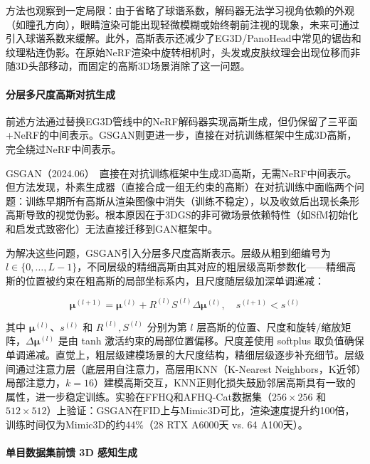 方法也观察到一定局限：由于省略了球谐系数，解码器无法学习视角依赖的外观（如瞳孔方向），眼睛渲染可能出现轻微模糊或始终朝前注视的现象，未来可通过引入球谐系数来缓解。此外，高斯表示还减少了EG3D/PanoHead中常见的锯齿和纹理粘连伪影。在原始NeRF渲染中旋转相机时，头发或皮肤纹理会出现位移而非随3D头部移动，而固定的高斯3D场景消除了这一问题。

\paragraph{分层多尺度高斯对抗生成}

前述方法通过替换EG3D管线中的NeRF解码器实现高斯生成，但仍保留了三平面+NeRF的中间表示。GSGAN则更进一步，直接在对抗训练框架中生成3D高斯，完全绕过NeRF中间表示。

GSGAN（2024.06）~\cite{2406_02968}直接在对抗训练框架中生成3D高斯，无需NeRF中间表示。但方法发现，朴素生成器（直接合成一组无约束的高斯）在对抗训练中面临两个问题：训练早期所有高斯从渲染图像中消失（训练不稳定），以及收敛后出现长条形高斯导致的视觉伪影。根本原因在于3DGS的非可微场景依赖特性（如SfM初始化和启发式致密化）无法直接迁移到GAN框架中。

为解决这些问题，GSGAN引入分层多尺度高斯表示。层级从粗到细编号为 $l \in \{0, \ldots, L-1\}$，不同层级的精细高斯由其对应的粗层级高斯参数化——精细高斯的位置被约束在粗高斯的局部坐标系内，且尺度随层级加深单调递减：

\begin{equation}
\boldsymbol{\mu}^{(l+1)} = \boldsymbol{\mu}^{(l)} + R^{(l)} S^{(l)} \Delta\boldsymbol{\mu}^{(l)}, \quad s^{(l+1)} < s^{(l)}
\end{equation}

其中 $\boldsymbol{\mu}^{(l)}$、$s^{(l)}$ 和 $R^{(l)}, S^{(l)}$ 分别为第 $l$ 层高斯的位置、尺度和旋转/缩放矩阵，$\Delta\boldsymbol{\mu}^{(l)}$ 是由 tanh 激活约束的局部位置偏移。尺度差使用 softplus 取负值确保单调递减。直觉上，粗层级建模场景的大尺度结构，精细层级逐步补充细节。层级间通过注意力层（底层用自注意力，高层用KNN（K-Nearest Neighbors，K近邻）局部注意力，$k=16$）建模高斯交互，KNN正则化损失鼓励邻居高斯具有一致的属性，进一步稳定训练。实验在FFHQ和AFHQ-Cat数据集（$256\times256$ 和 $512\times512$）上验证：GSGAN在FID上与Mimic3D可比，渲染速度提升约100倍，训练时间仅为Mimic3D的约44\%（28 RTX A6000天 vs. 64 A100天）。

\paragraph{单目数据集前馈 3D 感知生成}

